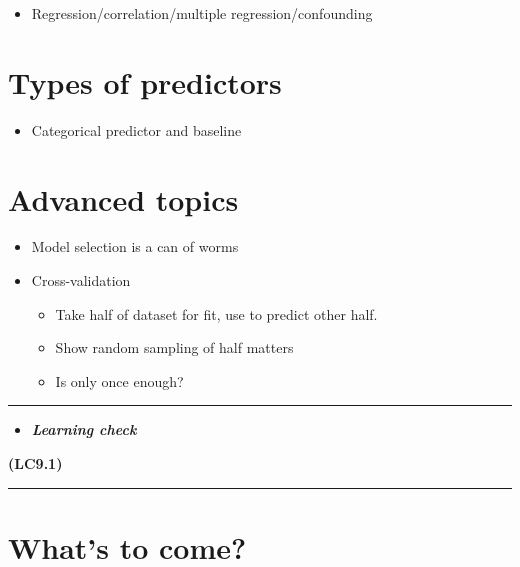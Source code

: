 \documentclass[]{tufte-book}
\providecommand{\tightlist}{%
  \setlength{\itemsep}{0pt}\setlength{\parskip}{0pt}}
\newenvironment{rmdblock}[1]
  {\begin{shaded*}
  \begin{itemize}
  \renewcommand{\labelitemi}{
    \raisebox{-.7\height}[0pt][0pt]{
    }
  }
  \item
  }
  {
  \end{itemize}
  \end{shaded*}
  }
\newenvironment{learncheck}
  {\begin{rmdblock}{warning}}
  {\end{rmdblock}}
\begin{document}
\begin{itemize}
\tightlist
\item
  Regression/correlation/multiple regression/confounding
\end{itemize}

\section{Types of predictors}\label{types-of-predictors}

\begin{itemize}
\tightlist
\item
  Categorical predictor and baseline
\end{itemize}

\section{Advanced topics}\label{advanced-topics}

\begin{itemize}
\tightlist
\item
  Model selection is a can of worms
\item
  Cross-validation

  \begin{itemize}
  \tightlist
  \item
    Take half of dataset for fit, use to predict other half.
  \item
    Show random sampling of half matters
  \item
    Is only once enough?
  \end{itemize}
\end{itemize}

\begin{center}\rule{\linewidth}{\linethickness}\end{center}

\begin{learncheck}
\textbf{\emph{Learning check}}
\end{learncheck}

\textbf{(LC9.1)}

\begin{center}\rule{\linewidth}{\linethickness}\end{center}

\section{What's to come?}\label{whats-to-come-6}
\end{document}
